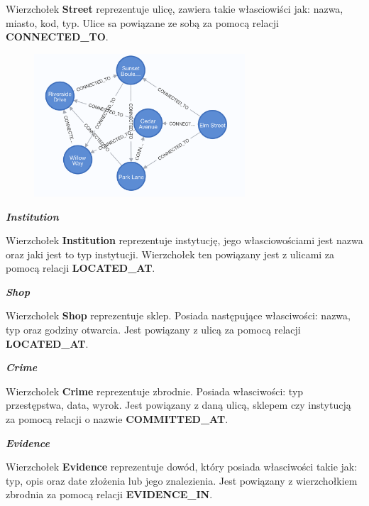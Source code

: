 \documentclass[a4paper,12pt]{article}
\begin{document}
Wierzchołek \textbf{Street} reprezentuje ulicę, zawiera takie własciowiści jak: nazwa, miasto, kod, typ. Ulice sa powiązane ze sobą za pomocą relacji \textbf{CONNECTED\_TO}.

\begin{figure}[h!]
    \centering
    \includegraphics[width=0.7\textwidth]{streets.png} 
\end{figure}

\begin{center}
    \textbf{\textit{Institution}}
\end{center}

Wierzchołek \textbf{Institution} reprezentuje instytucję, jego własciowościami jest nazwa oraz jaki jest to typ instytucji. Wierzchołek ten powiązany jest z ulicami za pomocą relacji \textbf{LOCATED\_AT}.

\begin{center}
    \textbf{\textit{Shop}}
\end{center}

Wierzchołek \textbf{Shop} reprezentuje sklep. Posiada następujące własciwości: nazwa, typ oraz godziny otwarcia. Jest powiązany z ulicą za pomocą relacji \textbf{LOCATED\_AT}.

\begin{center}
    \textbf{\textit{Crime}}
\end{center}

Wierzchołek \textbf{Crime} reprezentuje zbrodnie. Posiada własciwości: typ przestępstwa, data, wyrok. Jest powiązany z daną ulicą, sklepem czy instytucją za pomocą relacji o nazwie \textbf{COMMITTED\_AT}.

\begin{center}
    \textbf{\textit{Evidence}}
\end{center}

Wierzchołek \textbf{Evidence} reprezentuje dowód, który posiada własciwości takie jak: typ, opis oraz date złożenia lub jego znalezienia. Jest powiązany z wierzchołkiem zbrodnia za pomocą relacji \textbf{EVIDENCE\_IN}.
\end{document}
